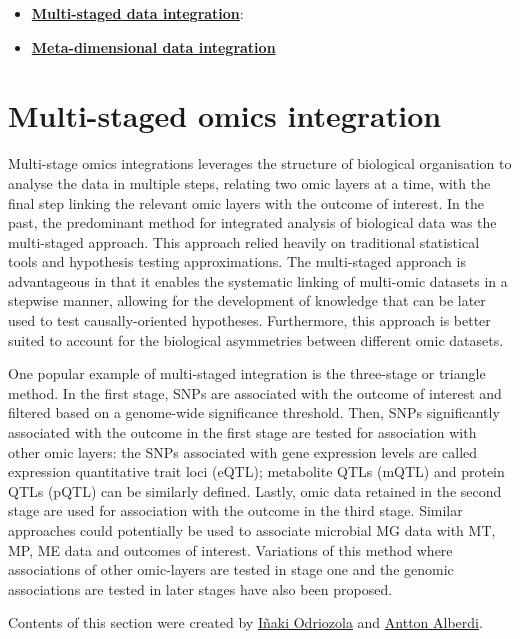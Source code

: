 \documentclass[
]{book}
\providecommand{\tightlist}{%
  \setlength{\itemsep}{0pt}\setlength{\parskip}{0pt}}
\begin{document}
\begin{itemize}
\tightlist
\item
  \textbf{\href{multi-staged-omics-integration}{Multi-staged data integration}}:
\item
  \textbf{\protect\hyperlink{meta-dimensional-omics-integration}{Meta-dimensional data integration}}
\end{itemize}

\hypertarget{multi-staged-omics-integration}{%
\chapter{Multi-staged omics integration}\label{multi-staged-omics-integration}}

Multi-stage omics integrations leverages the structure of biological organisation to analyse the data in multiple steps, relating two omic layers at a time, with the final step linking the relevant omic layers with the outcome of interest. In the past, the predominant method for integrated analysis of biological data was the multi-staged approach. This approach relied heavily on traditional statistical tools and hypothesis testing approximations. The multi-staged approach is advantageous in that it enables the systematic linking of multi-omic datasets in a stepwise manner, allowing for the development of knowledge that can be later used to test causally-oriented hypotheses. Furthermore, this approach is better suited to account for the biological asymmetries between different omic datasets.

One popular example of multi-staged integration is the three-stage or triangle method. In the first stage, SNPs are associated with the outcome of interest and filtered based on a genome-wide significance threshold. Then, SNPs significantly associated with the outcome in the first stage are tested for association with other omic layers: the SNPs associated with gene expression levels are called expression quantitative trait loci (eQTL); metabolite QTLs (mQTL) and protein QTLs (pQTL) can be similarly defined. Lastly, omic data retained in the second stage are used for association with the outcome in the third stage. Similar approaches could potentially be used to associate microbial MG data with MT, MP, ME data and outcomes of interest. Variations of this method where associations of other omic-layers are tested in stage one and the genomic associations are tested in later stages have also been proposed.

Contents of this section were created by \protect\hyperlink{inaki-odriozola}{Iñaki Odriozola} and \protect\hyperlink{antton-alberdi}{Antton Alberdi}.
\end{document}
